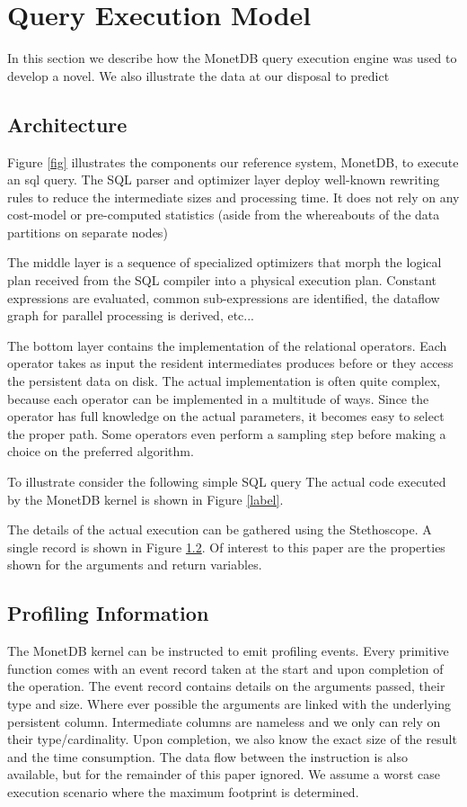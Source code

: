 \documentclass[conference]{IEEEtran}
\begin{document}
\section{Query Execution Model}
In this section we describe how the MonetDB query execution engine was used to develop a novel. We also illustrate the data at our disposal to predict

\subsection{Architecture}
Figure \ref{fig} illustrates the components our reference system, MonetDB, to execute an sql query. The SQL parser and optimizer layer deploy well-known rewriting rules to reduce the intermediate sizes and processing time. It does not rely on any cost-model or pre-computed statistics (aside from the whereabouts of the data partitions on separate nodes)

The middle layer is a sequence of specialized optimizers that morph the logical plan received from the SQL compiler into a physical execution plan. Constant expressions are evaluated, common sub-expressions are identified, the dataflow graph for parallel processing is derived, etc...

The bottom layer contains the implementation of the relational operators. Each operator takes as input the resident intermediates produces before or they access the persistent data on disk. The actual implementation is often quite complex, because each operator can be implemented in a multitude of ways. Since the operator has full knowledge on the actual parameters, it becomes easy to select the proper path. Some operators even perform a sampling step before making a choice on the preferred algorithm.

To illustrate consider the following simple SQL query
The actual code executed by the MonetDB kernel is shown in Figure \ref{label}. 

The details of the actual execution can be gathered using the Stethoscope. A single record is shown in Figure \ref{}. Of interest to this paper are the properties shown for the arguments and return variables.

\subsection{Profiling Information}
The MonetDB kernel can be instructed to emit profiling events. Every primitive function comes with an event record taken at the start and upon completion of the operation. The event record contains details on the arguments passed, their type and size. Where ever possible the arguments are linked with the underlying persistent column. Intermediate columns are nameless and we only can rely on their type/cardinality.
Upon completion, we also know the exact size of the result and the time consumption.
The data flow between the instruction is also available, but for the remainder of this paper ignored. We assume a worst case execution scenario where the maximum footprint is determined.
\end{document}
